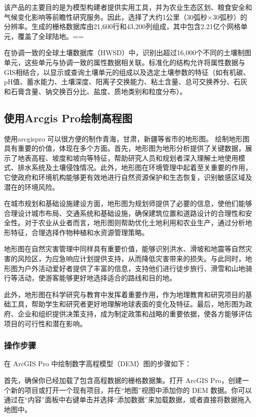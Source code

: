 \documentclass{article}
\begin{document}
	该产品的主要目的是为模型构建者提供实用工具，并为农业生态区划、粮食安全和气候变化影响等前瞻性研究服务。因此，选择了大约1公里（30弧秒×30弧秒）的分辨率。生成的栅格数据库由21,600行和43,200列组成，其中包含2.21亿个网格单元，覆盖了全球陆地。==
	
	在协调一致的全球土壤数据库（HWSD）中，识别出超过16,000个不同的土壤制图单元，这些单元与协调一致的属性数据相关联。标准化的结构允许将属性数据与GIS相结合，以显示或查询土壤单元的组成以及选定土壤参数的特征（如有机碳、pH值、蓄水能力、土壤深度、阳离子交换能力、粘土含量、总可交换养分、石灰和石膏含量、钠交换百分比、盐度、质地类别和粒度分布）。
		
	\subsection{使用Arcgis Pro绘制高程图}

使用arcgispro 可以很方便的制作青海，甘肃，新疆等省市的地形图。
绘制地形图具有重要的价值，体现在多个方面。首先，地形图为地形分析提供了关键数据，展示了地表高程、坡度和坡向等特征，帮助研究人员和规划者深入理解土地使用模式、排水系统及土壤侵蚀情况。此外，地形图在环境管理中起着至关重要的作用，它使政府和环境机构能够更有效地进行自然资源保护和生态恢复，识别敏感区域及潜在的环境风险。

在城市规划和基础设施建设方面，地形图为规划师提供了必要的信息，使他们能够合理设计城市布局、交通系统和基础设施，确保建筑位置和道路设计的合理性和安全性。对于农业从业者而言，地形图则帮助优化土地利用和农业生产，通过分析地形特征，合理选择作物种植和水资源管理策略。

地形图在自然灾害管理中同样具有重要价值，能够识别洪水、滑坡和地震等自然灾害的风险区，为应急响应计划提供支持，从而降低灾害带来的损失。与此同时，地形图为户外活动爱好者提供了丰富的信息，支持他们进行徒步旅行、滑雪和山地骑行等活动，使游客能够更好地选择适合的路线和目的地。

此外，地形图在科学研究与教育中发挥着重要作用，作为地理教育和研究项目的基础工具，帮助学生和研究者更好地理解地球表面的变化及特征。最后，地形图为政府、企业和组织提供决策支持，成为制定政策和战略的重要依据，使各方能够评估项目的可行性和潜在影响。

		\subsubsection{操作步骤}
		在 ArcGIS Pro 中绘制数字高程模型（DEM）图的步骤如下：
		
		首先，确保你已经加载了包含高程数据的栅格数据集。打开 ArcGIS Pro，创建一个新的项目或打开一个现有项目，并在“地图”视图中添加你的 DEM 数据。你可以通过在“内容”面板中右键单击并选择“添加数据”来加载数据，或者直接将数据拖入地图中。
		
\end{document}
